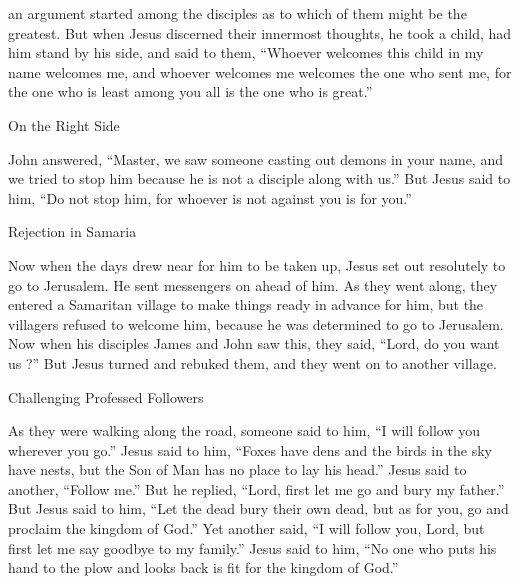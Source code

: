 {an argument
started
among
the disciples
as to which
of them
might be
the greatest.
But
when
Jesus
discerned
their
innermost thoughts,
he took
a child,
had
him
stand
by his side,
and
said
to them,
“Whoever
welcomes
this
child
in
my
name
welcomes
me,
and
whoever
welcomes
me
welcomes
the one who sent
me,
for
the one who is least
among
you
all
is the one
who is
great.”
\par }{\SH On the Right Side
\par }{\PP {}John
answered, “Master,
we saw
someone
casting out
demons
in
your
name,
and
we tried to stop
him
because
he is
not
a disciple
along with
us.”
But
Jesus
said
to
him,
“Do
not
stop
him, for
whoever
is
not
against
you
is
for
you.”
\par }{\SH Rejection in Samaria
\par }{\PP {}Now when the days
drew near
for him
to be taken up,
Jesus set out
resolutely to go
to
Jerusalem.
He sent
messengers
on ahead
of him.
As
they went along,
they entered
a Samaritan
village
to make things ready in advance
for him,
but
the villagers refused
to welcome
him,
because
he was determined to go
to
Jerusalem.
Now
when his disciples
James
and
John
saw
this, they said,
“Lord,
do you want
us
{}?”
But
Jesus turned
and rebuked
them,
and
they went on
to
another
village.
\par }{\SH Challenging Professed Followers
\par }{\PP {}As
they
were walking
along
the road,
someone
said
to
him,
“I will follow
you
wherever
you go.”
Jesus
said
to him,
“Foxes
have
dens
and
the birds
in the sky
have nests,
but
the Son
of Man
has
no
place
to lay
his head.”
Jesus said
to
another,
“Follow
me.”
But
he replied, “Lord, first
let
me
go
and bury
my
father.”
But
Jesus said
to him,
“Let
the dead
bury
their own
dead,
but
as for you,
go
and proclaim
the kingdom
of God.”
Yet
another
said,
“I will follow
you,
Lord,
but
first
let
me
say goodbye
to
my
family.”
Jesus
said
to
him,
“No one
who puts
his hand
to
the plow
and
looks
back
is
fit
for the kingdom
of God.”

}
